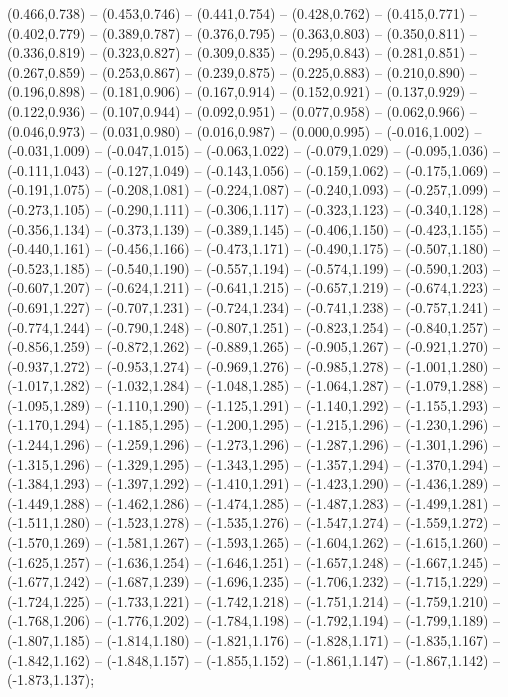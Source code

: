 (0.466,0.738) -- (0.453,0.746) -- (0.441,0.754) -- (0.428,0.762) -- (0.415,0.771) -- (0.402,0.779) -- (0.389,0.787) -- (0.376,0.795) -- (0.363,0.803) -- (0.350,0.811) -- (0.336,0.819) -- (0.323,0.827) -- (0.309,0.835) -- (0.295,0.843) -- (0.281,0.851) -- (0.267,0.859) -- (0.253,0.867) -- (0.239,0.875) -- (0.225,0.883) -- (0.210,0.890) -- (0.196,0.898) -- (0.181,0.906) -- (0.167,0.914) -- (0.152,0.921) -- (0.137,0.929) -- (0.122,0.936) -- (0.107,0.944) -- (0.092,0.951) -- (0.077,0.958) -- (0.062,0.966) -- (0.046,0.973) -- (0.031,0.980) -- (0.016,0.987) -- (0.000,0.995) -- (-0.016,1.002) -- (-0.031,1.009) -- (-0.047,1.015) -- (-0.063,1.022) -- (-0.079,1.029) -- (-0.095,1.036) -- (-0.111,1.043) -- (-0.127,1.049) -- (-0.143,1.056) -- (-0.159,1.062) -- (-0.175,1.069) -- (-0.191,1.075) -- (-0.208,1.081) -- (-0.224,1.087) -- (-0.240,1.093) -- (-0.257,1.099) -- (-0.273,1.105) -- (-0.290,1.111) -- (-0.306,1.117) -- (-0.323,1.123) -- (-0.340,1.128) -- (-0.356,1.134) -- (-0.373,1.139) -- (-0.389,1.145) -- (-0.406,1.150) -- (-0.423,1.155) -- (-0.440,1.161) -- (-0.456,1.166) -- (-0.473,1.171) -- (-0.490,1.175) -- (-0.507,1.180) -- (-0.523,1.185) -- (-0.540,1.190) -- (-0.557,1.194) -- (-0.574,1.199) -- (-0.590,1.203) -- (-0.607,1.207) -- (-0.624,1.211) -- (-0.641,1.215) -- (-0.657,1.219) -- (-0.674,1.223) -- (-0.691,1.227) -- (-0.707,1.231) -- (-0.724,1.234) -- (-0.741,1.238) -- (-0.757,1.241) -- (-0.774,1.244) -- (-0.790,1.248) -- (-0.807,1.251) -- (-0.823,1.254) -- (-0.840,1.257) -- (-0.856,1.259) -- (-0.872,1.262) -- (-0.889,1.265) -- (-0.905,1.267) -- (-0.921,1.270) -- (-0.937,1.272) -- (-0.953,1.274) -- (-0.969,1.276) -- (-0.985,1.278) -- (-1.001,1.280) -- (-1.017,1.282) -- (-1.032,1.284) -- (-1.048,1.285) -- (-1.064,1.287) -- (-1.079,1.288) -- (-1.095,1.289) -- (-1.110,1.290) -- (-1.125,1.291) -- (-1.140,1.292) -- (-1.155,1.293) -- (-1.170,1.294) -- (-1.185,1.295) -- (-1.200,1.295) -- (-1.215,1.296) -- (-1.230,1.296) -- (-1.244,1.296) -- (-1.259,1.296) -- (-1.273,1.296) -- (-1.287,1.296) -- (-1.301,1.296) -- (-1.315,1.296) -- (-1.329,1.295) -- (-1.343,1.295) -- (-1.357,1.294) -- (-1.370,1.294) -- (-1.384,1.293) -- (-1.397,1.292) -- (-1.410,1.291) -- (-1.423,1.290) -- (-1.436,1.289) -- (-1.449,1.288) -- (-1.462,1.286) -- (-1.474,1.285) -- (-1.487,1.283) -- (-1.499,1.281) -- (-1.511,1.280) -- (-1.523,1.278) -- (-1.535,1.276) -- (-1.547,1.274) -- (-1.559,1.272) -- (-1.570,1.269) -- (-1.581,1.267) -- (-1.593,1.265) -- (-1.604,1.262) -- (-1.615,1.260) -- (-1.625,1.257) -- (-1.636,1.254) -- (-1.646,1.251) -- (-1.657,1.248) -- (-1.667,1.245) -- (-1.677,1.242) -- (-1.687,1.239) -- (-1.696,1.235) -- (-1.706,1.232) -- (-1.715,1.229) -- (-1.724,1.225) -- (-1.733,1.221) -- (-1.742,1.218) -- (-1.751,1.214) -- (-1.759,1.210) -- (-1.768,1.206) -- (-1.776,1.202) -- (-1.784,1.198) -- (-1.792,1.194) -- (-1.799,1.189) -- (-1.807,1.185) -- (-1.814,1.180) -- (-1.821,1.176) -- (-1.828,1.171) -- (-1.835,1.167) -- (-1.842,1.162) -- (-1.848,1.157) -- (-1.855,1.152) -- (-1.861,1.147) -- (-1.867,1.142) -- (-1.873,1.137);

